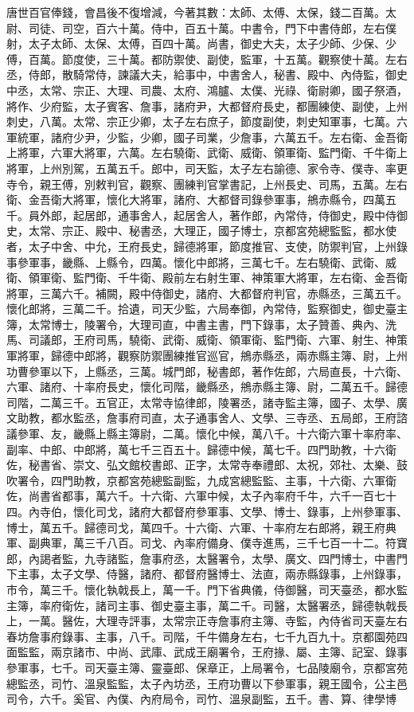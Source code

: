 \begin{pinyinscope}
 唐世百官俸錢，會昌後不復增減，今著其數：太師、太傅、太保，錢二百萬。太尉、司徒、司空，百六十萬。侍中，百五十萬。中書令，門下中書侍郎，左右僕射，太子太師、太保、太傅，百四十萬。尚書，御史大夫，太子少師、少保、少傅，百萬。節度使，三十萬。都防禦使、副使，監軍，十五萬。觀察使十萬。左右丞，侍郎，散騎常侍，諫議大夫，給事中，中書舍人，秘書、殿中、內侍監，御史中丞，太常、宗正、大理、司農、太府、鴻臚、太僕、光祿、衛尉卿，國子祭酒，將作、少府監，太子賓客、詹事，諸府尹，大都督府長史，都團練使、副使，上州刺史，八萬。太常、宗正少卿，太子左右庶子，節度副使，刺史知軍事，七萬。六軍統軍，諸府少尹，少監，少卿，國子司業，少詹事，六萬五千。左右衛、金吾衛上將軍，六軍大將軍，六萬。左右驍衛、武衛、威衛、領軍衛、監門衛、千牛衛上將軍，上州別駕，五萬五千。郎中，司天監，太子左右諭德、家令寺、僕寺、率更寺令，親王傅，別敕判官，觀察、團練判官掌書記，上州長史、司馬，五萬。左右衛、金吾衛大將軍，懷化大將軍，諸府、大都督司錄參軍事，鴘赤縣令，四萬五千。員外郎，起居郎，通事舍人，起居舍人，著作郎，內常侍，侍御史，殿中侍御史，太常、宗正、殿中、秘書丞，大理正，國子博士，京都宮苑總監監，都水使者，太子中舍、中允，王府長史，歸德將軍，節度推官、支使，防禦判官，上州錄事參軍事，畿縣、上縣令，四萬。懷化中郎將，三萬七千。左右驍衛、武衛、威衛、領軍衛、監門衛、千牛衛、殿前左右射生軍、神策軍大將軍，左右衛、金吾衛將軍，三萬六千。補闕，殿中侍御史，諸府、大都督府判官，赤縣丞，三萬五千。懷化郎將，三萬二千。拾遺，司天少監，六局奉御，內常侍，監察御史，御史臺主簿，太常博士，陵署令，大理司直，中書主書，門下錄事，太子贊善、典內、洗馬、司議郎，王府司馬，驍衛、武衛、威衛、領軍衛、監門衛、六軍、射生、神策軍將軍，歸德中郎將，觀察防禦團練推官巡官，鴘赤縣丞，兩赤縣主簿、尉，上州功曹參軍以下，上縣丞，三萬。城門郎，秘書郎，著作佐郎，六局直長，十六衛、六軍、諸府、十率府長史，懷化司階，畿縣丞，鴘赤縣主簿、尉，二萬五千。歸德司階，二萬三千。五官正，太常寺協律郎，陵署丞，諸寺監主簿，國子、太學、廣文助教，都水監丞，詹事府司直，太子通事舍人、文學、三寺丞、五局郎，王府諮議參軍、友，畿縣上縣主簿尉，二萬。懷化中候，萬八千。十六衛六軍十率府率、副率、中郎、中郎將，萬七千三百五十。歸德中候，萬七千。四門助教，十六衛佐，秘書省、崇文、弘文館校書郎、正字，太常寺奉禮郎、太祝，郊社、太樂、鼓吹署令，四門助教，京都宮苑總監副監，九成宮總監監、主事，十六衛、六軍衛佐，尚書省都事，萬六千。十六衛、六軍中候，太子內率府千牛，六千一百七十四。內寺伯，懷化司戈，諸府大都督府參軍事、文學、博士、錄事，上州參軍事、博士，萬五千。歸德司戈，萬四千。十六衛、六軍、十率府左右郎將，親王府典軍、副典軍，萬三千八百。司戈、內率府備身、僕寺進馬，三千七百一十二。符寶郎，內謁者監，九寺諸監，詹事府丞，太醫署令，太學、廣文、四門博士，中書門下主事，太子文學、侍醫，諸府、都督府醫博士、法直，兩赤縣錄事，上州錄事，市令，萬三千。懷化執戟長上，萬一千。門下省典儀，侍御醫，司天臺丞，都水監主簿，率府衛佐，諸司主事、御史臺主事，萬二千。司醫，太醫署丞，歸德執戟長上，一萬。醫佐，大理寺評事，太常宗正寺詹事府主簿、寺監，內侍省司天臺左右春坊詹事府錄事、主事，八千。司階，千牛備身左右，七千九百九十。京都園苑四面監監，兩京諸市、中尚、武庫、武成王廟署令，王府掾、屬、主簿、記室、錄事參軍事，七千。司天臺主簿、靈臺郎、保章正，上局署令，七品陵廟令，京都宮苑總監丞，司竹、溫泉監監，太子內坊丞，王府功曹以下參軍事，親王國令，公主邑司令，六千。奚官、內僕、內府局令，司竹、溫泉副監，五千。書、算、律學博
\end{pinyinscope}
